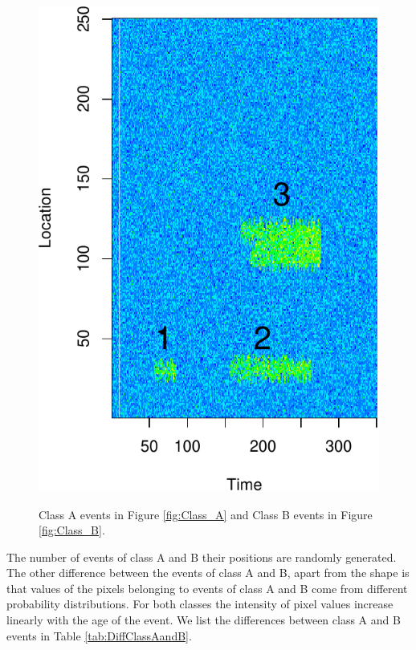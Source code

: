 \documentclass[11pt]{article}
\begin{document}
\begin{figure}[H]
{		\includegraphics[clip=true, scale=0.48]{./Graphics/3_B_Blobs_labels.pdf}
		\label{fig:Class_B}
	}
	\caption{\footnotesize Class A  events in Figure \ref{fig:Class_A}  and  Class B events in Figure \ref{fig:Class_B}.  }
	\label{fig:Classes_A_And_B}
\end{figure}
	 
	The number of events of class A and B their positions are randomly generated. The other difference between the events of class A and B, apart from the shape is that values of the pixels belonging to events of class A and B come from different probability distributions. For both classes the intensity of pixel values increase linearly with the age of the event.  We list the differences between class A and B events in Table \ref{tab:DiffClassAandB}.
	
\end{document}
